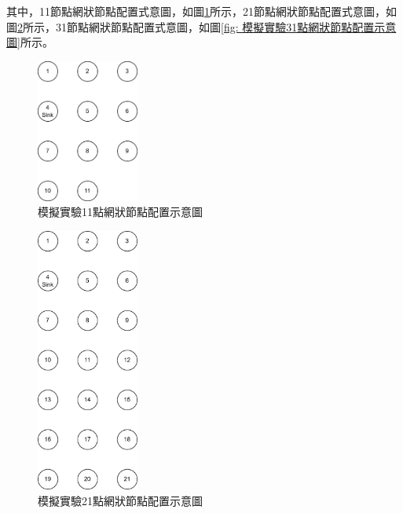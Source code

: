 \begin{ZhChapter}
其中，11節點網狀節點配置式意圖，如圖\ref{fig: 模擬實驗11點網狀節點配置示意圖}所示，21節點網狀節點配置式意圖，如圖\ref{fig: 模擬實驗21點網狀節點配置示意圖}所示，31節點網狀節點配置式意圖，如圖\ref{fig: 模擬實驗31點網狀節點配置示意圖}所示。

\begin{figure}[H]
    \centering
    \includegraphics[width = 0.3\textwidth]{image/模擬實驗11點網狀節點配置示意圖.png}
    \caption{模擬實驗11點網狀節點配置示意圖}
    \label{fig: 模擬實驗11點網狀節點配置示意圖}
\end{figure}

\begin{figure}[H]
    \centering
    \includegraphics[width = 0.3\textwidth]{image/模擬實驗21點網狀節點配置示意圖.png}
    \caption{模擬實驗21點網狀節點配置示意圖}
    \label{fig: 模擬實驗21點網狀節點配置示意圖}
\end{figure}


\end{ZhChapter}
